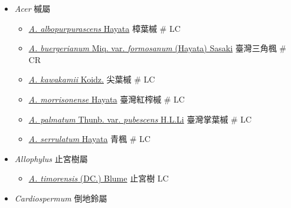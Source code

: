 
  \begin{itemize}
 \item[] \textit{Acer} 槭屬
                                
  \begin{itemize}
        \item[] \href{http://www.theplantlist.org/tpl1.1/search?q=Acer+albopurpurascens}{\textit{A. albopurpurascens} Hayata}   樟葉槭  \# LC
        \item[] \href{http://www.theplantlist.org/tpl1.1/search?q=Acer+buergerianum+var.+formosanum}{\textit{A. buergerianum} Miq. var. \textit{formosanum} (Hayata) Sasaki}   臺灣三角楓  \# CR
        \item[] \href{http://www.theplantlist.org/tpl1.1/search?q=Acer+kawakamii}{\textit{A. kawakamii} Koidz.}   尖葉槭  \# LC
        \item[] \href{http://www.theplantlist.org/tpl1.1/search?q=Acer+morrisonense}{\textit{A. morrisonense} Hayata}   臺灣紅榨槭  \# LC
        \item[] \href{http://www.theplantlist.org/tpl1.1/search?q=Acer+palmatum+var.+pubescens}{\textit{A. palmatum} Thunb. var. \textit{pubescens} H.L.Li}   臺灣掌葉槭  \# LC
        \item[] \href{http://www.theplantlist.org/tpl1.1/search?q=Acer+serrulatum}{\textit{A. serrulatum} Hayata}   青楓  \# LC
  \end{itemize}
 \item[] \textit{Allophylus} 止宮樹屬
                                
  \begin{itemize}
        \item[] \href{http://www.theplantlist.org/tpl1.1/search?q=Allophylus+timorensis}{\textit{A. timorensis} (DC.) Blume}   止宮樹   LC
  \end{itemize}
 \item[] \textit{Cardiospermum} 倒地鈴屬
                                

\end{itemize}
